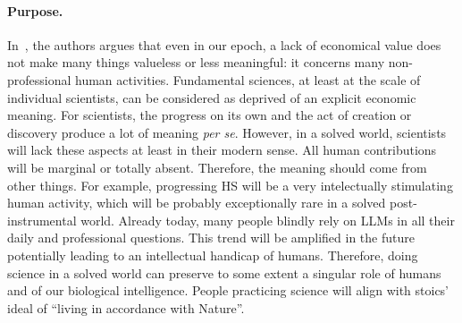 \documentclass[a4paper,11pt]{article}
\begin{document}

    \paragraph{Purpose.}

    In~\cite{LovingGrace}, the authors argues that even in our epoch, a lack of economical value does not make many things valueless or less meaningful: it concerns many non-professional human activities. Fundamental sciences, at least at the scale of individual scientists, can be considered as deprived of an explicit economic meaning. For scientists, the progress on its own and the act of creation or discovery produce a lot of meaning \emph{per se}. However, in a solved world, scientists will lack these aspects at least in their modern sense. All human contributions will be marginal or totally absent. Therefore, the meaning should come from other things.
    For example, progressing HS will be a very intelectually stimulating human activity, which will be probably exceptionally rare in a solved post-instrumental world. Already today, many people blindly rely on LLMs in all their daily and professional questions. This trend will be amplified in the future potentially leading to an intellectual handicap of humans. Therefore, doing science in a solved world can preserve to some extent a singular role of humans and of our biological intelligence. People practicing science will align with stoics' ideal of ``living in accordance with Nature''.
\end{document}
